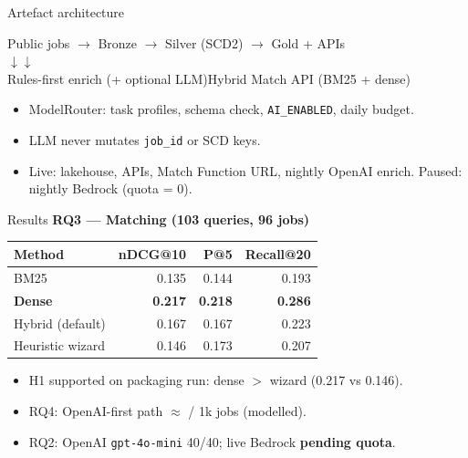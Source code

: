 \documentclass[aspectratio=169,11pt]{beamer}
\begin{document}
\begin{frame}{Artefact architecture}
  \small
  \begin{center}
    Public jobs $\rightarrow$ Bronze $\rightarrow$ Silver (SCD2) $\rightarrow$ Gold + APIs\\
    \hspace{2em}$\downarrow$\hspace{4em}$\downarrow$\\
    Rules-first enrich (+ optional LLM)\hspace{1em}Hybrid Match API (BM25 + dense)
  \end{center}
  \vspace{0.3em}
  \begin{itemize}
    \item ModelRouter: task profiles, schema check, \texttt{AI\_ENABLED}, daily budget.
    \item LLM never mutates \texttt{job\_id} or SCD keys.
    \item Live: lakehouse, APIs, Match Function URL, nightly OpenAI enrich. Paused: nightly Bedrock (quota = 0).
  \end{itemize}
\end{frame}

\begin{frame}{Results}
  \small
  \textbf{RQ3 --- Matching (103 queries, 96 jobs)}
  \vspace{0.2em}
  \begin{tabular}{@{}lrrr@{}}
    \toprule
    Method & nDCG@10 & P@5 & Recall@20 \\
    \midrule
    BM25 & 0.135 & 0.144 & 0.193 \\
    \textbf{Dense} & \textbf{0.217} & \textbf{0.218} & \textbf{0.286} \\
    Hybrid (default) & 0.167 & 0.167 & 0.223 \\
    Heuristic wizard & 0.146 & 0.173 & 0.207 \\
    \bottomrule
  \end{tabular}
  \vspace{0.4em}
  \begin{itemize}
    \item H1 supported on packaging run: dense $>$ wizard (0.217 vs 0.146).
    \item RQ4: OpenAI-first path $\approx$  / 1k jobs (modelled).
    \item RQ2: OpenAI \texttt{gpt-4o-mini} 40/40; live Bedrock \textbf{pending quota}.
  \end{itemize}
\end{frame}
\end{document}
